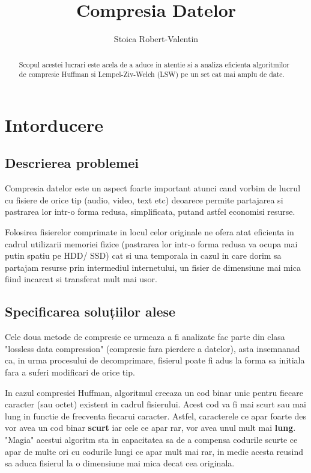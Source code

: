 \documentclass[runningheads]{llncs}
\begin{document}
\title{Compresia Datelor}
\author{Stoica Robert-Valentin}


\maketitle

\begin{abstract}
Scopul acestei lucrari este acela de a aduce in atentie si a analiza
eficienta algoritmilor de compresie Huffman si Lempel-Ziv-Welch (LSW)
pe un set cat mai amplu de date.

\end{abstract}



\section{Intorducere}

\subsection{Descrierea problemei}
Compresia datelor este un aspect foarte important atunci cand vorbim de
lucrul cu fisiere de orice tip (audio, video, text etc) deoarece permite
partajarea si pastrarea lor intr-o forma redusa, simplificata, putand astfel
economisi resurse.

Folosirea fisierelor comprimate in locul celor originale ne ofera atat eficienta
in cadrul utilizarii memoriei fizice (pastrarea lor intr-o forma redusa va ocupa
mai putin spatiu pe HDD/ SSD) cat si una temporala in cazul in care dorim sa
partajam resurse prin intermediul internetului, un fisier de dimensiune mai mica 
fiind incarcat si transferat mult mai usor.

\subsection{Specificarea soluțiilor alese}

Cele doua metode de compresie ce urmeaza a fi analizate fac parte din clasa
"lossless data compression" (compresie fara pierdere a datelor), asta insemnanad
ca, in urma procesului de decomprimare, fisierul poate fi adus la forma sa 
initiala fara a suferi modificari de orice tip.

In cazul compresiei Huffman, algoritmul creeaza un cod binar unic pentru fiecare
caracter (sau octet) existent in cadrul fisierului. Acest cod va fi mai scurt
sau mai lung in functie de frecventa fiecarui caracter.
Astfel, caracterele ce apar foarte des vor avea un cod binar \textbf{scurt} iar cele ce
apar rar, vor avea unul mult mai \textbf{lung}. "Magia" acestui algoritm sta in capacitatea
sa de a compensa codurile scurte ce apar de multe ori cu codurile lungi ce apar mult
mai rar, in medie acesta reusind sa aduca fisierul la o dimensiune mai mica decat cea
originala.
\end{document}

